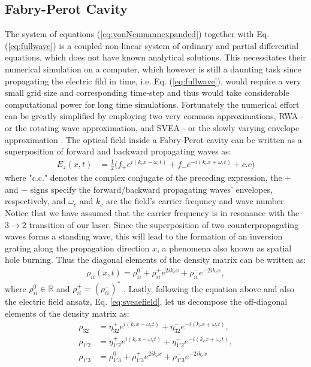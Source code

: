 \documentclass[10pt,letterpaper]{article}
\begin{document}
\subsection{Fabry-Perot Cavity} 
The system of equations (\ref{eq:vonNeumannexpanded})  together with Eq. (\ref{eq:fullwave}) is a coupled non-linear system of ordinary and partial differential equations, which does not have known analytical solutions. This necessitates their numerical simulation on a computer, which however is still a daunting task since propagating the electric fild in time, i.e. Eq. (\ref{eq:fullwave}), would require a very small grid size and corresponding time-step and thus would take considerable computational power for long time simulations. Fortunately the numerical effort can be greatly simplified by employing two very common approximations, RWA - or the rotating wave approximation, and SVEA - or the slowly varying envelope approximation \cite{boyd2010}. The optical field inside a Fabry-Perot cavity can be written as a superposition of forward and backward propagating waves as: 
\begin{align}
	E_z(x,t) &= \frac{1}{2} \big ( f_{+} e^{i(k_c x-\omega_c t)} + f_{-} e^{-i(k_c x+\omega_c t)} + c.c \big )\label{eq:sveaefield}
\end{align}
where "c.c." denotes the complex conjugate of the preceding expression, the $+$ and $-$ signs specify the forward/backward propagating waves' envelopes, respectively, and $\omega_c$  and $k_c$ are the field's  carrier frequncy and wave number. Notice that we have assumed that the carrier frequency is in resonance with the $3\to 2$ transition of our laser. Since the superposition of two counterpropagating waves forms a standing wave, this will lead to the formation of an inversion grating along the propagation direction $x$, a phenomena also known as spatial hole burning. Thus the diagonal elements of the density matrix can be written as:
\begin{align}
      \rho_{ii}(x,t) = \rho_{ii}^0 + \rho_{ii}^+ e^{2ik_c x} + \rho_{ii}^-e^{-2ik_c x}, 	\label{eq:sveapops}
\end{align}
where $\rho_{ii}^0 \in \mathbb{R} $  and  $\rho_{ii}^+ = (\rho_{ii}^-)^*$ . Lastly, following the equation above and also the electric field ansatz, Eq. \ref{eq:sveaefield}, let us decompose the off-diagonal elements of the density matrix as:
\begin{align}
   \rho_{32} &= \eta_{32}^{+}e^{i(k_cx-\omega_ct)} + \eta_{32}^{-}e^{-i(k_c x+\omega_c t)}, \nonumber \\
   \rho_{1'2} &= \eta_{1'2}^{+}e^{i(k_c x - \omega_c t)} + \eta_{1'2}^{-}e^{-i(k_c x+\omega_c t)}, \nonumber \\
   \rho_{1'3} &= \rho_{1'3}^0 + \rho_{1'3}^{+} e^{2ik_cx} +  \rho_{1'3}^{-} e^{-2ik_cx}   \label{eq:sveacoherences}
\end{align}
\end{document}
